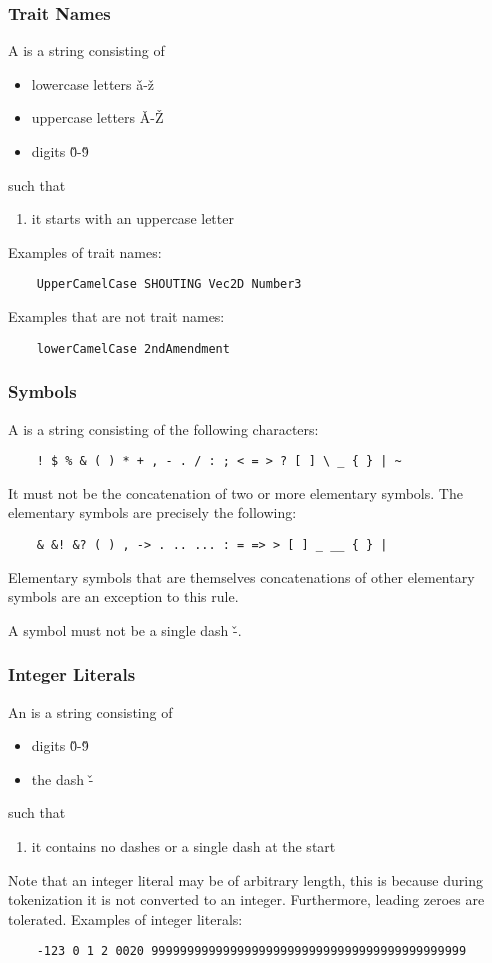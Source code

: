 \documentclass{article}
\begin{document}
\subsubsection{Trait Names}
A \ttrait is a string consisting of
\begin{itemize}
    \item lowercase letters \v a-\v z
    \item uppercase letters \v A-\v Z
    \item digits \v0-\v9
\end{itemize}
such that
\begin{enumerate}
    \item it starts with an uppercase letter
\end{enumerate}
Examples of trait names:
\begin{verbatim}
    UpperCamelCase SHOUTING Vec2D Number3 
\end{verbatim}
Examples that are not trait names:
\begin{verbatim}
    lowerCamelCase 2ndAmendment
\end{verbatim}
\subsubsection{Symbols}
A \tsym is a string consisting of the following
characters:
\begin{verbatim}
    ! $ % & ( ) * + , - . / : ; < = > ? [ ] \ _ { } | ~
\end{verbatim}
It must not be the concatenation of two or more
elementary symbols.
The elementary symbols are precisely the following:
\begin{verbatim}
    & &! &? ( ) , -> . .. ... : = => > [ ] _ __ { } |
\end{verbatim}
Elementary symbols that are themselves concatenations of
other elementary symbols are an exception to this rule.

A symbol must not be a single dash \v-.
\subsubsection{Integer Literals}
An \tint is a string consisting of
\begin{itemize}
    \item digits \v0-\v9
    \item the dash \v-
\end{itemize}
such that
\begin{enumerate}
    \item it contains no dashes or a single dash
    at the start
\end{enumerate}
Note that an integer literal may be of arbitrary length,
this is because during tokenization it is not 
converted to an integer.
Furthermore, leading zeroes are tolerated.
Examples of integer literals:
\begin{verbatim}
    -123 0 1 2 0020 99999999999999999999999999999999999999999999
\end{verbatim}
\end{document}
